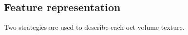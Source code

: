 %


\subsection{Feature representation}\label{subsec:fearep}

Two strategies are used to describe each \ac{oct} volume texture.

